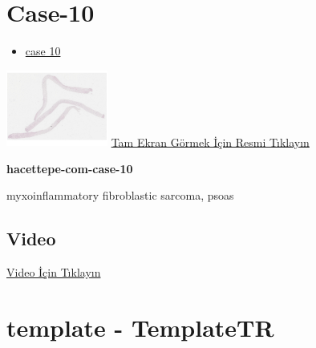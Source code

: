 \documentclass[
  letterpaper,
  DIV=11,
  numbers=noendperiod]{scrreprt}
\providecommand{\tightlist}{%
  \setlength{\itemsep}{0pt}\setlength{\parskip}{0pt}}\usepackage{longtable,booktabs,array}
\begin{document}
\hypertarget{sec-hacettepe-case-of-the-month-case-10}{%
\section{Case-10}\label{sec-hacettepe-case-of-the-month-case-10}}

\begin{itemize}
\tightlist
\item
  \href{https://www.youtube.com/watch?v=0vNcCaTYstU&ab_channel=KemalKosemehmetoglu}{case
  10}
\end{itemize}

\href{https://images.patolojiatlasi.com/hacettepe-com-case-10/HE.html}{\includegraphics[width=0.25\textwidth,height=\textheight]{./screenshots/thumbnail_hacettepe-com-case-10.png}}
\href{https://images.patolojiatlasi.com/hacettepe-com-case-10/HE.html}{Tam
Ekran Görmek İçin Resmi Tıklayın}

\textbf{hacettepe-com-case-10}

\begin{tcolorbox}[enhanced jigsaw, breakable, opacitybacktitle=0.6, arc=.35mm, colbacktitle=quarto-callout-tip-color!10!white, colback=white, toptitle=1mm, left=2mm, opacityback=0, colframe=quarto-callout-tip-color-frame, titlerule=0mm, rightrule=.15mm, bottomrule=.15mm, toprule=.15mm, bottomtitle=1mm, title=\textcolor{quarto-callout-tip-color}{\faLightbulb}\hspace{0.5em}{Tanı}, coltitle=black, leftrule=.75mm]

myxoinflammatory fibroblastic sarcoma, psoas

\end{tcolorbox}

\hypertarget{video-9}{%
\subsection{Video}\label{video-9}}

\href{https://www.youtube.com/watch?v=0vNcCaTYstU}{Video İçin Tıklayın}

\hypertarget{sec-template}{%
\section{template - TemplateTR}\label{sec-template}}
\end{document}
